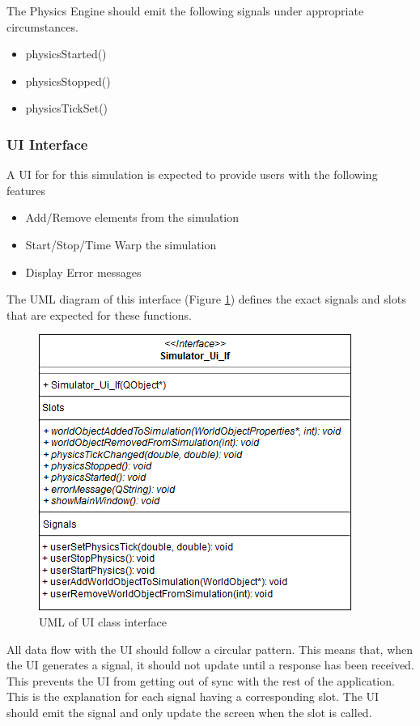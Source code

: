   The Physics Engine should emit the following signals under appropriate circumstances.
  \begin{itemize}
  	\item physicsStarted()
  	\item physicsStopped()
  	\item physicsTickSet()
  \end{itemize}
  
  \subsubsection*{UI Interface}
  A UI for for this simulation is expected to provide users with the following features
  \begin{itemize}
  	\item Add/Remove elements from the simulation
  	\item Start/Stop/Time Warp the simulation
  	\item Display Error messages
  \end{itemize}
  
  The UML diagram of this interface (Figure \ref{uml:ui_if}) defines the exact signals and slots that are expected for these functions.
 \begin{figure}[h]
 	\begin{center}
 	\includegraphics[scale=0.5]{./images_design/uml/Ui_If}
 	\caption{UML of UI class interface\label{uml:ui_if}}
 	\end{center}
 \end{figure}
 
 All data flow with the UI should follow a circular pattern. This means that, when the UI generates a signal, it should not update until a response has been received. This prevents the UI from getting out of sync with the rest of the application. This is the explanation for each signal having a corresponding slot. The UI should emit the signal and only update the screen when the slot is called.
 	
